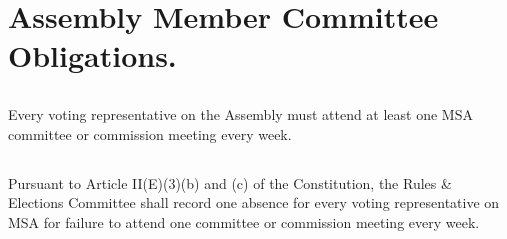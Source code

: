 \section{Assembly Member Committee Obligations.}

\subsection{}
Every voting representative on the Assembly must attend at least one MSA committee or commission meeting every week.

\subsection{}
Pursuant to Article II(E)(3)(b) and (c) of the Constitution, the Rules \& Elections Committee shall record one absence for every voting representative on MSA for failure to attend one committee or commission meeting every week.
